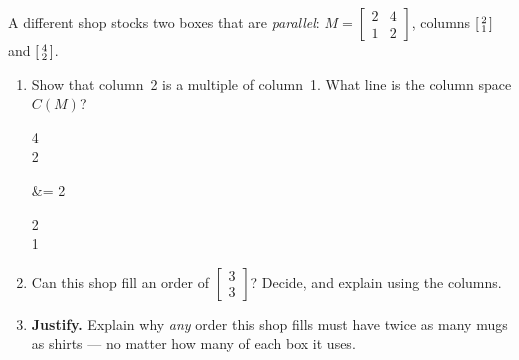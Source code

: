 \documentclass[10pt]{article}
\begin{document}
\begin{tcolorbox}[colback=white, colframe=black!40, title=\textbf{Tier E --- Extension},
    fonttitle=\bfseries, arc=1.5mm, left=3mm, right=3mm, top=2mm, bottom=2mm, breakable]
A different shop stocks two boxes that are \emph{parallel}:
$M=\begin{bmatrix} 2 & 4 \\ 1 & 2 \end{bmatrix}$, columns $\begin{bsmallmatrix} 2\\1 \end{bsmallmatrix}$ and
$\begin{bsmallmatrix} 4\\2 \end{bsmallmatrix}$.
\begin{enumerate}[leftmargin=1.7em, itemsep=8pt]
  \item Show that column~2 is a multiple of column~1. What line is the column space $C(M)$?
\begin{work}
  \begin{bsmallmatrix} 4\\2 \end{bsmallmatrix}
      &= 2\begin{bsmallmatrix} 2\\1 \end{bsmallmatrix}
\end{work}
  \item Can this shop fill an order of $\begin{bmatrix} 3 \\ 3 \end{bmatrix}$? Decide, and explain
        using the columns.
  \item \textbf{Justify.} Explain why \emph{any} order this shop fills must have
        twice as many mugs as shirts --- no matter how many of each box it uses.

\end{enumerate}
\end{tcolorbox}
\end{document}
